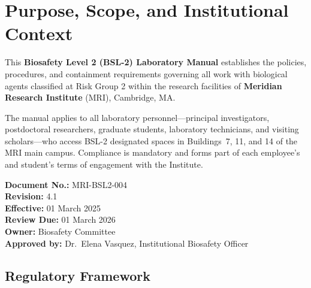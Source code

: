 
\section{Purpose, Scope, and Institutional Context}
\label{sec:introduction}

\begin{minipage}[t]{0.68\linewidth}
This \textbf{Biosafety Level 2 (BSL-2) Laboratory Manual} establishes the policies,
procedures, and containment requirements governing all work with biological agents
classified at Risk Group 2 within the research facilities of
\textbf{Meridian Research Institute} (MRI), Cambridge, MA.

The manual applies to all laboratory personnel—principal investigators, postdoctoral
researchers, graduate students, laboratory technicians, and visiting scholars—who
access BSL-2 designated spaces in Buildings~7, 11, and 14 of the MRI main campus.
Compliance is mandatory and forms part of each employee's and student's terms of
engagement with the Institute.
\end{minipage}\hfill
\begin{minipage}[t]{0.29\linewidth}
  \begin{tcolorbox}[
    enhanced, colback=BSLlight, colframe=BSLamber,
    arc=4pt, outer arc=4pt, boxrule=1.2pt,
    fonttitle=\sffamily\bfseries\footnotesize\color{BSLamber},
    title={\biosymbol\; Manual Details},
    left=6pt, right=6pt, top=6pt, bottom=6pt
  ]
  \sffamily\scriptsize
  \textbf{Document No.:} MRI-BSL2-004\\[3pt]
  \textbf{Revision:} 4.1\\[3pt]
  \textbf{Effective:} 01 March 2025\\[3pt]
  \textbf{Review Due:} 01 March 2026\\[3pt]
  \textbf{Owner:} Biosafety Committee\\[3pt]
  \textbf{Approved by:} Dr.\ Elena Vasquez,\newline
  Institutional Biosafety Officer
  \end{tcolorbox}
\end{minipage}

\subsection{Regulatory Framework}

